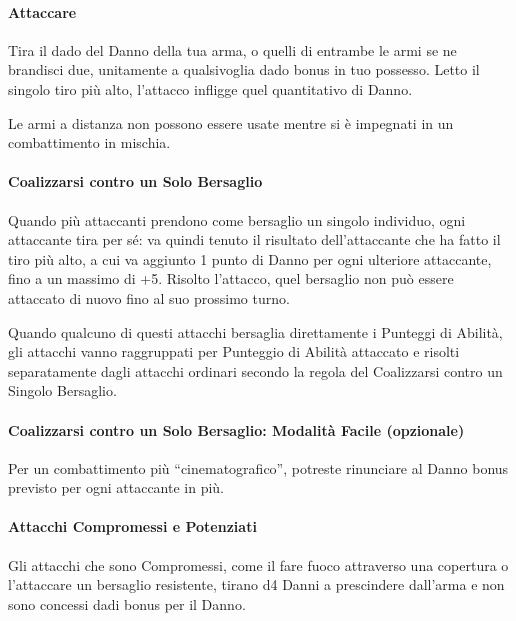\documentclass[itdr]{subfiles}
\begin{document}
\paragraph{Attaccare}
Tira il dado del Danno della tua arma, o quelli di entrambe le armi se ne brandisci due, unitamente a qualsivoglia dado bonus in tuo possesso. Letto il singolo tiro più alto, l’attacco infligge quel quantitativo di Danno.

Le armi a distanza non possono essere usate mentre si è impegnati in un combattimento in mischia.

\vfill

\paragraph{Coalizzarsi contro un Solo Bersaglio }
 Quando più attaccanti prendono come bersaglio un singolo individuo, ogni attaccante tira per sé: va quindi tenuto il risultato dell’attaccante che ha fatto il tiro più alto, a cui va aggiunto 1 punto di Danno per ogni ulteriore attaccante, fino a un massimo di +5. Risolto l’attacco, quel bersaglio non può essere attaccato di nuovo fino al suo prossimo turno. 

Quando qualcuno di questi attacchi bersaglia direttamente i Punteggi di Abilità, gli attacchi vanno raggruppati per Punteggio di Abilità attaccato e risolti separatamente dagli attacchi ordinari secondo la regola del Coalizzarsi contro un Singolo Bersaglio.

\vfill

\begin{dbox}
\paragraph{Coalizzarsi contro un Solo Bersaglio: Modalità Facile (opzionale)}
Per un combattimento più “cinematografico”, potreste rinunciare al Danno bonus previsto per ogni attaccante in più.
\end{dbox}

\vfill
\break

\paragraph{Attacchi Compromessi e Potenziati}
Gli attacchi che sono Compromessi, come il fare fuoco attraverso una copertura o l’attaccare un bersaglio resistente, tirano d4 Danni a prescindere dall’arma e non sono concessi dadi bonus per il Danno.
\end{document}
